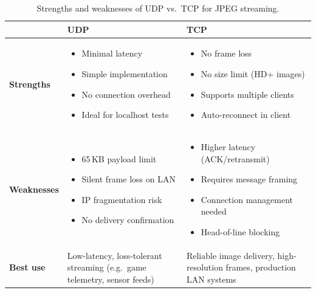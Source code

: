 \documentclass[12pt,a4paper]{article}
\begin{document}
\begin{table}[H]
\centering
\renewcommand{\arraystretch}{1.4}
\begin{tabularx}{\textwidth}{>{\bfseries}p{2cm} X X}
\toprule
 & \textbf{UDP} & \textbf{TCP} \\
\midrule
\textbf{Strengths}
& \vspace{-0.4cm}\begin{itemize}
    \item Minimal latency
    \item Simple implementation
    \item No connection overhead
    \item Ideal for localhost tests
  \end{itemize}
& \vspace{-0.4cm}\begin{itemize}
    \item No frame loss
    \item No size limit (HD+ images)
    \item Supports multiple clients
    \item Auto-reconnect in client
  \end{itemize} \\
\textbf{Weaknesses}
& \vspace{-0.4cm}\begin{itemize}
    \item 65\,KB payload limit
    \item Silent frame loss on LAN
    \item IP fragmentation risk
    \item No delivery confirmation
  \end{itemize}
& \vspace{-0.4cm}\begin{itemize}
    \item Higher latency (ACK/retransmit)
    \item Requires message framing
    \item Connection management needed
    \item Head-of-line blocking
  \end{itemize} \\
\textbf{Best use}
& Low-latency, loss-tolerant streaming (e.g.\ game telemetry, sensor feeds)
& Reliable image delivery, high-resolution frames, production LAN systems \\
\bottomrule
\end{tabularx}
\caption{Strengths and weaknesses of UDP vs.\ TCP for JPEG streaming.}
\end{table}
\end{document}
